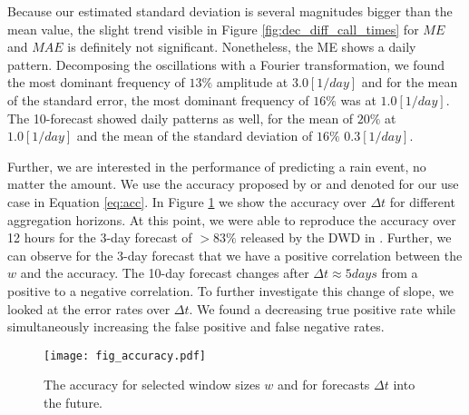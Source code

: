 \documentclass{article}
\theoremstyle{plain}
\theoremstyle{definition}
\theoremstyle{remark}
\begin{document}
Because our estimated standard deviation is several magnitudes bigger than the
mean value, the slight trend visible in Figure \ref{fig:dec_diff_call_times}
for $ME$ and $MAE$ is definitely not significant. Nonetheless, the ME shows a
daily pattern. Decomposing the oscillations with a Fourier transformation, we
found the most dominant frequency of $13\%$ amplitude at $3.0 [1/day]$
and for the mean of the standard error, the most dominant frequency of $16\%$
was at $1.0 [1/day]$. The 10-forecast showed daily patterns as well, for the
mean of $20\%$ at $1.0 [1/day]$ and the mean of the standard deviation of
$16\%$ $0.3 [1/day]$.

Further, we are interested in the performance of predicting a rain event, no
matter the amount. We use the accuracy proposed by \cite{Forecast_quaility_DWD}
or \cite{ECMWF_DL_acc_improvement} and denoted for our use case in Equation
\ref{eq:acc}. In Figure \ref{fig:accuracy} we show the accuracy over $\Delta t$
for different aggregation horizons. At this point, we were able to reproduce
the accuracy over 12 hours for the 3-day forecast of $> 83 \%$ released by the
DWD in \cite{Forecast_quaility_DWD}. Further, we can observe for the 3-day
forecast that we have a positive correlation between the $w$ and the accuracy.
The 10-day forecast changes after $\Delta t\approx 5 days$ from a positive to a
negative correlation. To further investigate this change of slope, we looked at
the error rates over $\Delta t$. We found a decreasing true positive rate while
simultaneously increasing the false positive and false negative rates.

\begin{figure}
    \centering
    \texttt{[image: fig\_accuracy.pdf]}
    \caption{The accuracy for selected window sizes $w$ and for forecasts
        $\Delta t$ into the future.}
    \label{fig:accuracy}
\end{figure}
\end{document}
